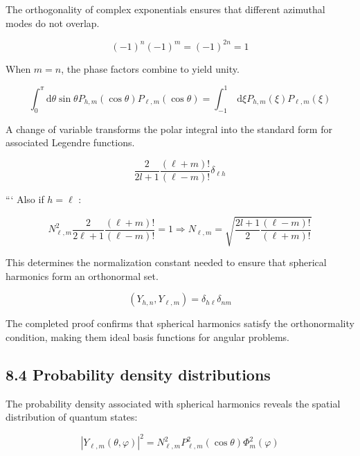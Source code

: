 \documentclass[italian]{HKNdocument}
\begin{document}
The orthogonality of complex exponentials ensures that different azimuthal modes do not overlap.

\begin{equation*}
(-1)^{n}(-1)^{m}=(-1)^{2 n}=1 \tag{8.54}
\end{equation*}

When $m=n$, the phase factors combine to yield unity.

\begin{equation*}
\int_{0}^{\pi} \mathrm{d} \theta \sin \theta P_{h, m}(\cos \theta) P_{\ell, m}(\cos \theta)=\int_{-1}^{1} \mathrm{~d} \xi P_{h, m}(\xi) P_{\ell, m}(\xi) \tag{8.55}
\end{equation*}

A change of variable transforms the polar integral into the standard form for associated Legendre functions.

\begin{equation*}
\frac{2}{2 l+1} \frac{(\ell+m)!}{(\ell-m)!} \delta_{\ell h} \tag{8.56}
\end{equation*}

```
Also if $h=\ell$ :

\begin{equation*}
N_{\ell, m}^{2} \frac{2}{2 \ell+1} \frac{(\ell+m)!}{(\ell-m)!}=1 \Longrightarrow N_{\ell, m}=\sqrt{\frac{2 l+1}{2} \frac{(\ell-m)!}{(\ell+m)!}} \tag{8.57}
\end{equation*}

This determines the normalization constant needed to ensure that spherical harmonics form an orthonormal set.

\begin{equation*}
\left(Y_{h, n}, Y_{\ell, m}\right)=\delta_{h \ell} \delta_{n m} \tag{8.58}
\end{equation*}

The completed proof confirms that spherical harmonics satisfy the orthonormality condition, making them ideal basis functions for angular problems.

\subsection*{8.4 Probability density distributions}
The probability density associated with spherical harmonics reveals the spatial distribution of quantum states:

\begin{equation*}
\left|Y_{\ell, m}(\theta, \varphi)\right|^{2}=N_{\ell, m}^{2} P_{\ell, m}^{2}(\cos \theta) \Phi_{m}^{2}(\varphi) \tag{8.59}
\end{equation*}
\end{document}
